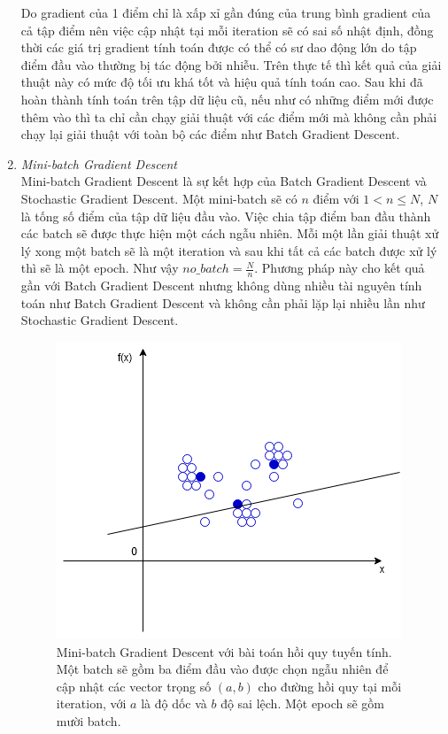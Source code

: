 \begin{enumerate}
Do gradient của 1 điểm chỉ là xấp xỉ gần đúng của trung bình gradient của cả tập điểm nên việc cập nhật tại mỗi iteration sẽ có sai số nhật định, đồng thời các giá trị gradient tính toán được có thể có sư dao động lớn do tập điểm đầu vào thường bị tác động bởi nhiễu. Trên thực tế thì kết quả của giải thuật này có mức độ tối ưu khá tốt và hiệu quả tính toán cao. Sau khi đã hoàn thành tính toán trên tập dữ liệu cũ, nếu như có những điểm mới được thêm vào thì ta chỉ cần chạy giải thuật với các điểm mới mà không cần phải chạy lại giải thuật với toàn bộ các điểm như Batch Gradient Descent.
\item \emph{Mini-batch Gradient Descent}\\
Mini-batch Gradient Descent là sự kết hợp của Batch Gradient Descent và Stochastic Gradient Descent. Một mini-batch sẽ có $n$ điểm với $1<n{\leq}N$, $N$ là tống số điểm của tập dữ liệu đầu vào. Việc chia tập điểm ban đầu thành các batch sẽ được thực hiện một cách ngẫu nhiên. Mỗi một lần giải thuật xử lý xong một  batch sẽ là một iteration và sau khi tất cả các batch được xử lý thì sẽ là một epoch. Như vậy $no\_batch=\frac{N}{n}$. Phương pháp này cho kết quả gần với Batch Gradient Descent nhưng không dùng nhiều tài nguyên tính toán như Batch Gradient Descent và không cần phải lặp lại nhiều lần như Stochastic Gradient Descent.
\begin{figure}[ht!]
	\centerline{\includegraphics[scale=0.6]{images/mini_batch_gradient_descent.png}}
  	\caption{Mini-batch Gradient Descent với bài toán hồi quy tuyến tính. Một batch sẽ gồm ba điểm đầu vào được chọn ngẫu nhiên để cập nhật các vector trọng số $(a,b)$ cho đường hồi quy tại mỗi iteration, với $a$ là độ dốc và $b$ độ sai lệch. Một epoch sẽ gồm mười batch.}
  	\label{fig:mini_batch_gradient_descent}
\end{figure}
\end{enumerate}

